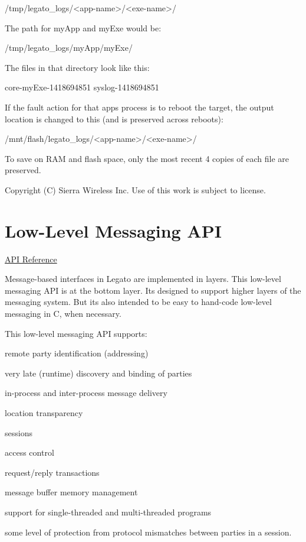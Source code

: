\begin{DoxyVerb} /tmp/legato_logs/<app-name>/<exe-name>/\end{DoxyVerb}


The path for my\+App and my\+Exe would be\+:

\begin{DoxyVerb} /tmp/legato_logs/myApp/myExe/\end{DoxyVerb}


The files in that directory look like this\+:

\begin{DoxyVerb} core-myExe-1418694851
 syslog-1418694851\end{DoxyVerb}


If the fault action for that app\textquotesingle{}s process is to reboot the target, the output location is changed to this (and is preserved across reboots)\+:

\begin{DoxyVerb} /mnt/flash/legato_logs/<app-name>/<exe-name>/\end{DoxyVerb}


To save on R\+A\+M and flash space, only the most recent 4 copies of each file are preserved.





Copyright (C) Sierra Wireless Inc. Use of this work is subject to license. \hypertarget{c_messaging}{}\section{Low-\/\+Level Messaging A\+P\+I}\label{c_messaging}
\hyperlink{le__messaging_8h}{A\+P\+I Reference}





Message-\/based interfaces in Legato are implemented in layers. This low-\/level messaging A\+P\+I is at the bottom layer. It\textquotesingle{}s designed to support higher layers of the messaging system. But it\textquotesingle{}s also intended to be easy to hand-\/code low-\/level messaging in C, when necessary.

This low-\/level messaging A\+P\+I supports\+:
\begin{DoxyItemize}
\item remote party identification (addressing)
\item very late (runtime) discovery and binding of parties
\item in-\/process and inter-\/process message delivery
\item location transparency
\item sessions
\item access control
\item request/reply transactions
\item message buffer memory management
\item support for single-\/threaded and multi-\/threaded programs
\item some level of protection from protocol mismatches between parties in a session.
\end{DoxyItemize}


